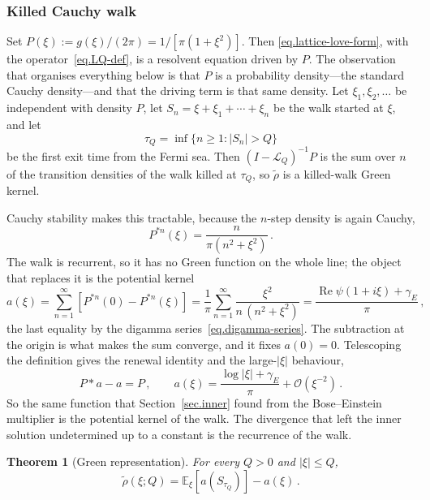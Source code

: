 \documentclass[11pt,a4paper]{article}
\newtheorem{theorem}{Theorem}[section]
\theoremstyle{definition}
\begin{document}
\subsubsection{Killed Cauchy walk}
\label{sec.matching-C}

Set $P(\xi):=g(\xi)/(2\pi)=1/[\pi(1+\xi^2)]$.  Then
\eqref{eq.lattice-love-form}, with the operator~\eqref{eq.LQ-def}, is a
resolvent equation driven by $P$.
The observation that organises everything below is that $P$ is a probability
density---the standard Cauchy density---and that the driving term is that same
density.  Let $\xi_1,\xi_2,\ldots$ be independent with density $P$, let
$S_n = \xi + \xi_1 + \cdots + \xi_n$ be the walk started at $\xi$, and let
\begin{equation}\label{eq.exit-time}
  \tau_Q = \inf\{n \geq 1 : |S_n| > Q\}
\end{equation}
be the first exit time from the Fermi sea.  Then $(I-\mathcal{L}_Q)^{-1}P$ is
the sum over $n$ of the transition densities of the walk killed at $\tau_Q$, so
$\tilde\rho$ is a killed-walk Green kernel.

Cauchy stability makes this tractable, because the $n$-step density is again
Cauchy,
\begin{equation}\label{eq.n-step}
  P^{*n}(\xi) = \frac{n}{\pi(n^2+\xi^2)}\,.
\end{equation}
The walk is recurrent, so it has no Green function on the whole line; the
object that replaces it is the potential kernel
\begin{equation}\label{eq.potential-kernel}
  a(\xi)
  = \sum_{n=1}^{\infty}\left[P^{*n}(0) - P^{*n}(\xi)\right]
  = \frac{1}{\pi}\sum_{n=1}^{\infty}\frac{\xi^2}{n\,(n^2+\xi^2)}
  = \frac{\operatorname{Re}\psi(1+i\xi) + \gamma_E}{\pi}\,,
\end{equation}
the last equality by the digamma series~\eqref{eq.digamma-series}.  The
subtraction at the origin is what makes the sum converge, and it fixes
$a(0) = 0$.  Telescoping the definition gives the renewal identity and the
large-$|\xi|$ behaviour,
\begin{equation}\label{eq.a-properties}
  P*a - a = P\,,
  \qquad
  a(\xi) = \frac{\log|\xi| + \gamma_E}{\pi} + \mathcal O(\xi^{-2})\,.
\end{equation}
So the same function that Section~\ref{sec.inner} found from the Bose--Einstein
multiplier is the potential kernel of the walk.  The divergence that left the
inner solution undetermined up to a constant is the recurrence of the walk.

\begin{theorem}[Green representation]\label{thm:green}
For every $Q > 0$ and $|\xi| \leq Q$,
\begin{equation}\label{eq.green-formula}
  \tilde\rho(\xi;Q) = \mathbb{E}_\xi \left[a(S_{\tau_Q})\right] - a(\xi)\,.
\end{equation}
\end{theorem}
\end{document}
